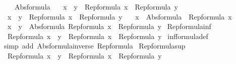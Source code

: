 \begin{isabellebody}
\isanewline
{}\isamarkupfalse%
\isanewline
\ \ {\isachardoublequoteopen}{\isasymbottom}\ {\isacharequal}\ Abs{\isacharunderscore}formula\ {\isacharbraceleft}{\isacharbraceright}{\isachardoublequoteclose}\isanewline
\isanewline
{}\isamarkupfalse%
\isanewline
\ \ {\isachardoublequoteopen}x\ {\isasymle}\ y\ {\isasymlongleftrightarrow}\ Rep{\isacharunderscore}formula\ x\ {\isasymsubseteq}\ Rep{\isacharunderscore}formula\ y{\isachardoublequoteclose}\isanewline
\isanewline
{}\isamarkupfalse%
\isanewline
\ \ {\isachardoublequoteopen}x\ {\isacharless}\ y\ {\isasymlongleftrightarrow}\ Rep{\isacharunderscore}formula\ x\ {\isasymsubset}\ Rep{\isacharunderscore}formula\ y{\isachardoublequoteclose}\isanewline
\isanewline
{}\isamarkupfalse%
\isanewline
\ \ {\isachardoublequoteopen}{\isacharminus}\ x\ {\isacharequal}\ Abs{\isacharunderscore}formula\ {\isacharparenleft}{\isacharminus}\ {\isacharparenleft}Rep{\isacharunderscore}formula\ x{\isacharparenright}{\isacharparenright}{\isachardoublequoteclose}\isanewline
\isanewline
{}\isamarkupfalse%
\isanewline
\ \ {\isachardoublequoteopen}x\ {\isacharminus}\ y\ {\isacharequal}\ Abs{\isacharunderscore}formula\ {\isacharparenleft}Rep{\isacharunderscore}formula\ x\ {\isacharminus}\ Rep{\isacharunderscore}formula\ y{\isacharparenright}{\isachardoublequoteclose}\isanewline
\isanewline
{}\isamarkupfalse%
\ Rep{\isacharunderscore}formula{\isacharunderscore}inf{\isacharcolon}\isanewline
\ \ {\isachardoublequoteopen}Rep{\isacharunderscore}formula\ {\isacharparenleft}x\ {\isasymsqinter}\ y{\isacharparenright}\ {\isacharequal}\ Rep{\isacharunderscore}formula\ x\ {\isasyminter}\ Rep{\isacharunderscore}formula\ y{\isachardoublequoteclose}\isanewline
%
\isadelimproof
%
\endisadelimproof
%
\isatagproof
{}\isamarkupfalse%
\ inf{\isacharunderscore}formula{\isacharunderscore}def\isanewline
{}\isamarkupfalse%
\ {\isacharparenleft}simp\ add{\isacharcolon}\ Abs{\isacharunderscore}formula{\isacharunderscore}inverse\ Rep{\isacharunderscore}formula{\isacharparenright}%
\endisatagproof
{\isafoldproof}%
%
\isadelimproof
\isanewline
%
\endisadelimproof
\isanewline
{}\isamarkupfalse%
\ Rep{\isacharunderscore}formula{\isacharunderscore}sup{\isacharcolon}\isanewline
\ \ {\isachardoublequoteopen}Rep{\isacharunderscore}formula\ {\isacharparenleft}x\ {\isasymsqunion}\ y{\isacharparenright}\ {\isacharequal}\ Rep{\isacharunderscore}formula\ x\ {\isasymunion}\ Rep{\isacharunderscore}formula\ y{\isachardoublequoteclose}\isanewline

\end{isabellebody}
